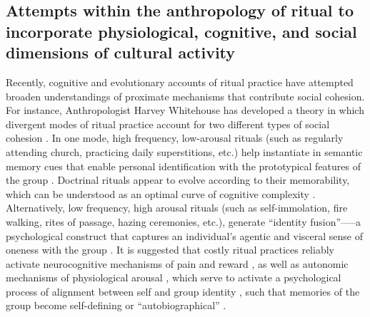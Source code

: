 \begin{CJK}{UTF8}{gbsn}



\subsection{Attempts within the anthropology of ritual to incorporate physiological, cognitive, and social dimensions of cultural activity\label{sect:cogEvAnth}}

Recently, cognitive and evolutionary accounts of ritual practice have attempted broaden understandings of proximate mechanisms that contribute social cohesion.  For instance, Anthropologist Harvey Whitehouse has developed a theory in which divergent modes of ritual practice account for two different types of social cohesion \citep[commonly known as the ``modes theory''][]{Whitehouse1996,Whitehouse2004,Whitehouse2014}.  In one mode, high frequency, low-arousal rituals (such as regularly attending church, practicing daily superstitions, etc.) help instantiate in semantic memory cues that enable personal identification with the prototypical features of the group \cite[i.e., ``group identification,'' cf.][]{Turner1987}.  Doctrinal rituals appear to evolve according to their memorability, which can be understood as an optimal curve of cognitive complexity \citep[][]{Whitehouse2005,Kapitany2015}.  Alternatively, low frequency, high arousal rituals (such as self-immolation, fire walking, rites of passage, hazing ceremonies, etc.), generate ``identity fusion''—--a psychological construct that captures an individual’s agentic and visceral sense of oneness with the group \citep{Swann2009,Swann2015}.  It is suggested that costly ritual practices reliably activate neurocognitive mechanisms of pain and reward \citep{Fischer2014a}, as well as autonomic mechanisms of physiological arousal \citep{Swann2010,Jackson2018}, which serve to activate a psychological process of alignment between self and group identity \citep{Xygalatas2013}, such that memories of the group become self-defining or ``autobiographical'' \citep[see][]{Whitehouse2014}.


\end{CJK}
